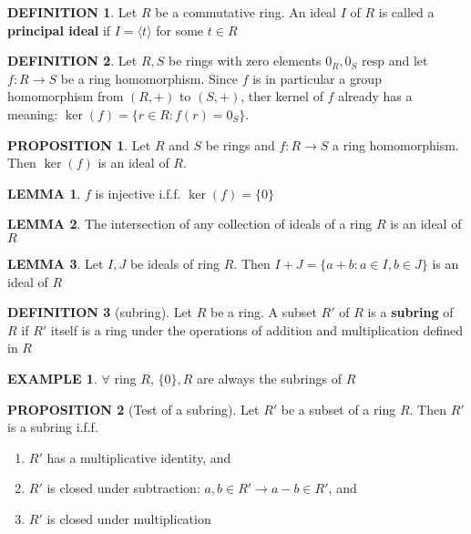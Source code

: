 \documentclass[12pt]{article}
\theoremstyle{definition}
\newtheorem{definition}{DEFINITION}[subsection]
\newtheorem{lemma}{LEMMA}[subsection]
\newtheorem{prop}{PROPOSITION}[subsection]
\newtheorem{example}{EXAMPLE}[subsection]
\begin{document}
\begin{definition}
    Let $R$ be a commutative ring. An ideal $I$ of $R$ is called a \textbf{principal ideal} if $I = \langle t \rangle$ for some $t \in R$
\end{definition}

\begin{definition}
    Let $R,S$ be rings with zero elements $0_R,0_S$ resp and let $f:R\rightarrow S$ be a ring homomorphism. Since $f$ is in particular a group homomorphism from $(R,+)$ to $(S,+)$, ther kernel of $f$ already has a meaning: $\ker(f) = \{r \in R: f(r) = 0_S\}$.
\end{definition}

\begin{prop}
    Let $R$ and $S$ be rings and $f:R \rightarrow S$ a ring homomorphism. Then $\ker(f)$ is an ideal of $R$.
\end{prop}

\begin{lemma}
    $f$ is injective i.f.f. $\ker(f) = \{0\}$
\end{lemma}

\begin{lemma}
    The intersection of any collection of ideals of a ring $R$ is an ideal of $R$
\end{lemma}

\begin{lemma}
    Let $I,J$ be ideals of ring $R$. Then $I+J = \{a+b:a\in I, b\in J\}$ is an ideal of $R$
\end{lemma}

\begin{definition}[subring]
    Let $R$ be a ring. A subset $R'$ of $R$ is a \textbf{subring} of $R$ if $R'$ itself is a ring under the operations of addition and multiplication defined in $R$
\end{definition}

\begin{example}
    $\forall$ ring $R$, $\{0\}, R$ are always the subrings of $R$
\end{example}

\begin{prop}[Test of a subring]
    Let $R'$ be a subset of a ring $R$. Then $R'$ is a subring i.f.f.
    \begin{enumerate}
        \item $R'$ has a multiplicative identity, and
        \item $R'$ is closed under subtraction: $a,b\in R' \rightarrow a-b\in R'$, and
        \item $R'$ is closed under multiplication
    \end{enumerate}
\end{prop}
\end{document}
